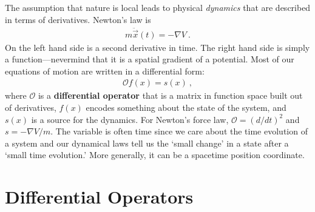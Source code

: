 


The assumption that nature is local leads to physical \emph{dynamics} that are described in terms of derivatives. Newton's law is 
\begin{align}
    m \ddot{\vec{x}} (t) = -\nabla V \ .
\end{align}
On the left hand side is a second derivative in time. The right hand side is simply a function---nevermind that it is a spatial gradient of a potential. Most of our equations of motion are written in a differential form:
\begin{align}
    \mathcal O f(x) = s(x) \ ,
\end{align}
where $\mathcal O$ is a \textbf{differential operator} that is a matrix in function space built out of derivatives, $f(x)$ encodes something about the state of the system, and $s(x)$ is a source for the dynamics. For Newton's force law, $\mathcal O = (d/dt)^2$ and $s=-\nabla V/m$. The variable is often time since we care about the time evolution of a system and our dynamical laws tell us the `small change' in a state after a `small time evolution.' More generally, it can be a spacetime position coordinate.



\section{Differential Operators}


